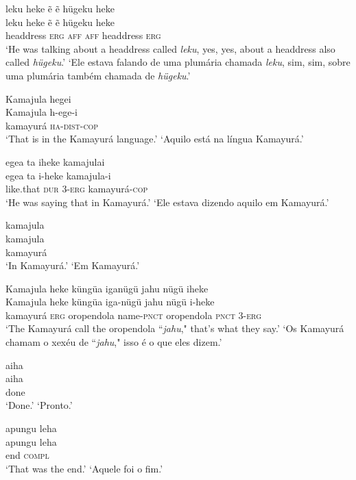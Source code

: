 \documentclass[output=paper,
modfonts,nonflat
]{langsci/langscibook}
\begin{document}
\ea  leku heke ẽ ẽ hügeku heke\\[.3em]
\gll leku heke ẽ ẽ hügeku heke\\
     headdress \textsc{erg} \textsc{aff} \textsc{aff} headdress \textsc{erg}\\
\glt ‘He was talking about a headdress called \textit{leku}, yes, yes, about a headdress also called \textit{hügeku}.’
\glt ‘Ele estava falando de uma plumária chamada \textit{leku}, sim, sim, sobre uma plumária também chamada de \textit{hügeku}.’
\z

\ea  Kamajula hegei\\[.3em]
\gll Kamajula h-ege-i\\
     kamayurá \textsc{ha}-\textsc{dist}-\textsc{cop}\\
\glt ‘That is in the Kamayurá language.’
\glt ‘Aquilo está na língua Kamayurá.’
\z

\ea  egea ta iheke kamajulai\\[.3em]
\gll egea ta i-heke kamajula-i\\
     like.that \textsc{dur} 3-\textsc{erg} kamayurá-\textsc{cop}\\
\glt ‘He was saying that in Kamayurá.’
\glt ‘Ele estava dizendo aquilo em Kamayurá.’
\z

\ea  kamajula\\[.3em]
\gll kamajula\\
     kamayurá\\
\glt ‘In Kamayurá.’
\glt ‘Em Kamayurá.’
\z

\ea  Kamajula heke küngüa iganügü jahu nügü iheke\\[.3em]
\gll Kamajula heke küngüa iga-nügü jahu nügü i-heke\\
     kamayurá \textsc{erg} oropendola name-\textsc{pnct} oropendola \textsc{pnct} 3-\textsc{erg}\\
\glt ‘The Kamayurá call the oropendola “\textit{jahu}," that's what they say.’
\glt ‘Os Kamayurá chamam o xexéu de “\textit{jahu}," isso é o que eles dizem.’
\z

\ea  aiha\\[.3em]
\gll aiha\\
     done\\
\glt ‘Done.’
\glt ‘Pronto.’
\z

\ea  apungu leha\\[.3em]
\gll apungu leha\\
     end \textsc{compl}\\
\glt ‘That was the end.’
\glt ‘Aquele foi o fim.’
\z
\end{document}
